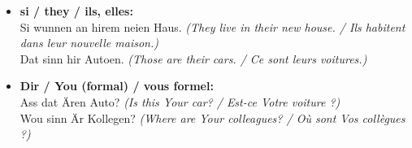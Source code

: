 \begin{itemize}
    \item \textbf{si / they / ils, elles:} \\
    Si wunnen an hirem neien Haus. \textit{(They live in their new house. / Ils habitent dans leur nouvelle maison.)} \\
    Dat sinn hir Autoen. \textit{(Those are their cars. / Ce sont leurs voitures.)}
    
    \item \textbf{Dir / You (formal) / vous formel:} \\
    Ass dat Ären Auto? \textit{(Is this Your car? / Est-ce Votre voiture ?)} \\
    Wou sinn Är Kollegen? \textit{(Where are Your colleagues? / Où sont Vos collègues ?)}
\end{itemize}
